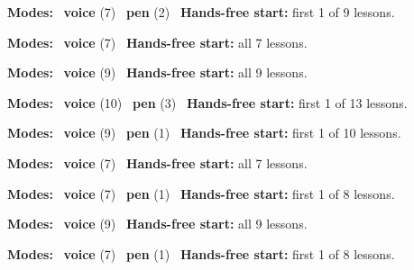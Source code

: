 \expandafter\def\csname hlchaptermodality14\endcsname{%
  {\small\noindent
    \textbf{Modes:} \hlvoicesign{}~\textbf{voice} (7) \quad \hlpensign{}~\textbf{pen} (2)\quad
    \hlvoicesign{}~\textbf{Hands-free start:} first 1 of 9 lessons.%
    \par}\medskip
}

\expandafter\def\csname hlchaptermodality15\endcsname{%
  {\small\noindent
    \textbf{Modes:} \hlvoicesign{}~\textbf{voice} (7)\quad
    \hlvoicesign{}~\textbf{Hands-free start:} all 7 lessons.%
    \par}\medskip
}

\expandafter\def\csname hlchaptermodality16\endcsname{%
  {\small\noindent
    \textbf{Modes:} \hlvoicesign{}~\textbf{voice} (9)\quad
    \hlvoicesign{}~\textbf{Hands-free start:} all 9 lessons.%
    \par}\medskip
}

\expandafter\def\csname hlchaptermodality17\endcsname{%
  {\small\noindent
    \textbf{Modes:} \hlvoicesign{}~\textbf{voice} (10) \quad \hlpensign{}~\textbf{pen} (3)\quad
    \hlvoicesign{}~\textbf{Hands-free start:} first 1 of 13 lessons.%
    \par}\medskip
}

\expandafter\def\csname hlchaptermodality18\endcsname{%
  {\small\noindent
    \textbf{Modes:} \hlvoicesign{}~\textbf{voice} (9) \quad \hlpensign{}~\textbf{pen} (1)\quad
    \hlvoicesign{}~\textbf{Hands-free start:} first 1 of 10 lessons.%
    \par}\medskip
}

\expandafter\def\csname hlchaptermodality19\endcsname{%
  {\small\noindent
    \textbf{Modes:} \hlvoicesign{}~\textbf{voice} (7)\quad
    \hlvoicesign{}~\textbf{Hands-free start:} all 7 lessons.%
    \par}\medskip
}

\expandafter\def\csname hlchaptermodality20\endcsname{%
  {\small\noindent
    \textbf{Modes:} \hlvoicesign{}~\textbf{voice} (7) \quad \hlpensign{}~\textbf{pen} (1)\quad
    \hlvoicesign{}~\textbf{Hands-free start:} first 1 of 8 lessons.%
    \par}\medskip
}

\expandafter\def\csname hlchaptermodality21\endcsname{%
  {\small\noindent
    \textbf{Modes:} \hlvoicesign{}~\textbf{voice} (9)\quad
    \hlvoicesign{}~\textbf{Hands-free start:} all 9 lessons.%
    \par}\medskip
}

\expandafter\def\csname hlchaptermodality22\endcsname{%
  {\small\noindent
    \textbf{Modes:} \hlvoicesign{}~\textbf{voice} (7) \quad \hlpensign{}~\textbf{pen} (1)\quad
    \hlvoicesign{}~\textbf{Hands-free start:} first 1 of 8 lessons.%
    \par}\medskip
}
